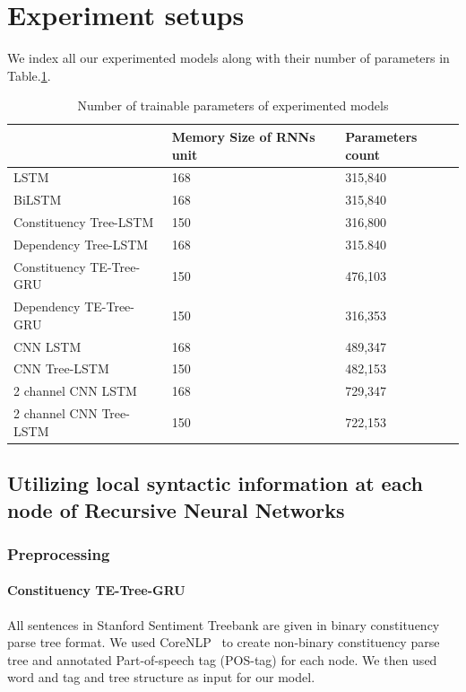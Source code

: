\section{Experiment setups}
We index all our experimented models along with their number of parameters in Table.\ref{table:paramtable}.

\begin{table}[H]
    \centering
    \caption{Number of trainable parameters of experimented models}
    \label{table:paramtable}
    \begin{tabular}{lll}
        ~ & Memory Size of RNNs unit & Parameters count \\ \hline
        LSTM                     & 168         & 315,840          \\
        BiLSTM                   & 168         & 315,840          \\
        Constituency Tree-LSTM   & 150         & 316,800          \\
        Dependency Tree-LSTM     & 168         & 315.840          \\
        Constituency TE-Tree-GRU & 150         & 476,103          \\
        Dependency TE-Tree-GRU   & 150         & 316,353          \\
        CNN LSTM                 & 168         & 489,347          \\
        CNN Tree-LSTM            & 150         & 482,153          \\
        2 channel CNN LSTM       & 168         & 729,347          \\
        2 channel CNN Tree-LSTM  & 150         & 722,153
    \end{tabular}
\end{table}
\subsection{Utilizing local syntactic information at each node of Recursive Neural Networks}
\subsubsection{Preprocessing}
\paragraph{Constituency TE-Tree-GRU}
All sentences in Stanford Sentiment Treebank are given in binary constituency parse tree format.
We used CoreNLP~\cite{manning2014stanford} to create non-binary constituency parse tree and annotated Part-of-speech tag (POS-tag) for each node. 
We then used word and tag and tree structure as input for our model.


